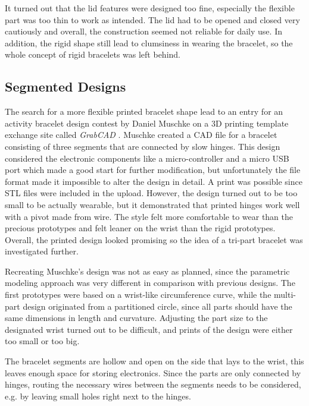 It turned out that the lid features were designed too fine, especially the flexible part was too thin to work as intended. The lid had to be opened and closed very cautiously and overall, the construction seemed not reliable for daily use. In addition, the rigid shape still lead to clumsiness in wearing the bracelet, so the whole concept of rigid bracelets was left behind.

\subsection{Segmented Designs}

The search for a more flexible printed bracelet shape lead to an entry for an activity bracelet design contest by Daniel Muschke on a 3D printing template exchange site called \textit{GrabCAD} \cite{amicobracelet}. Muschke created a \ac{CAD} file for a bracelet consisting of three segments that are connected by slow hinges. This design considered the electronic components like a micro-controller and a micro \ac{USB} port which made a good start for further modification, but unfortunately the file format made it impossible to alter the design in detail. A print was possible since \ac{STL} files were included in the upload. However, the design turned out to be too small to be actually wearable, but it demonstrated that printed hinges work well with a pivot made from wire. The style felt more comfortable to wear than the precious prototypes and felt leaner on the wrist than the rigid prototypes. Overall, the printed design looked promising so the idea of a tri-part bracelet was investigated further.

Recreating Muschke's design was not as easy as planned, since the parametric modeling approach was very different in comparison with previous designs. The first prototypes were based on a wrist-like circumference curve, while the multi-part design originated from a partitioned circle, since all parts should have the same dimensions in length and curvature. Adjusting the part size to the designated wrist turned out to be difficult, and prints of the design were either too small or too big.

The bracelet segments are hollow and open on the side that lays to the wrist, this leaves enough space for storing electronics. Since the parts are only connected by hinges, routing the necessary wires between the segments needs to be considered, e.g. by leaving small holes right next to the hinges.

